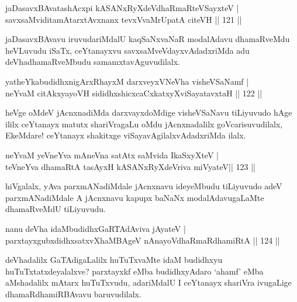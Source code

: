 \begin{shl}
jaDasavxBAvatashAcxpi kASANxRyXdeVdhaRmaRteVSayxteV | \\
savxsaMviditamAtarxtAvxnanx tevxVvaMrUpatA citeVH \hfill||  121 ||  
\end{shl}

\begin{artha}
jaDasavxBAvavu iruvudariMdalU kaqSaNxvaNaR modalAdavu dhamaRveMdu heVLuvudu iSaTx, ceYtanayxvu savxsaMveVdayxvAdadxriMda adu deVhadhamaRveMbudu samamxtavAguvudilalx.
\end{artha}

\begin{shl}
yatheYkabudidhxnigArxRhayxM darxveyxVNeVha visheVSaNamf | \\
neYvaM citAkxyayoVH sididhxshicxcaCxkatxyXviSayatavxtaH \hfill||  122 ||  
\end{shl}

\begin{artha}
heVge oMdeV jAcnxnadiMda darxvayxdoMdige visheVSaNavu tiLiyuvudo hAge ililx ceYtanayx matutx shariVragaLu oMdu jAcnxnadalilx goVcarisuvudilalx, EkeMdare! ceYtanayx shakitxge viSayavAgilalxvAdadxriMda ilalx.
\end{artha}


\begin{shl}
neYvaM yeVneYva mAneVna satAtx saMvida IkaSxyXteV |  \\
teVneYva dhamaRtA tasAyxH kASANxRyXdeVriva miVyateV\hfill ||  123 ||  
\end{shl}

\begin{artha}
hiVgalalx, yAva parxmANadiMdale jAcnxnavu ideyeMbudu tiLiyuvudo adeV parxmANadiMdale A jAcnxnavu kapupx baNaNx modalAdavugaLaMte dhamaRveMdU tiLiyuvudu.
\end{artha}


\begin{shl}
nanu deVha idaMbudidhxGaRTAdAviva jAyateV |  \\
parxtayxgubxdidhxsatxvXhaMBAgeV nAnayoVdhaRmaRdhamiRtA \hfill ||  124 ||  
\end{shl}

\begin{artha}
deVhadalilx GaTAdigaLalilx huTuTxvaMte idaM budidhxyu huTuTxtatxdeyalalxve? parxtayxkf eMba budidhxyAdaro `ahamf' eMba aMshadalilx mAtarx huTuTxvudu, adariMdalU I ceYtanayx shariVra ivugaLige dhamaRdhamiRBAvavu baruvudilalx.
\end{artha}

